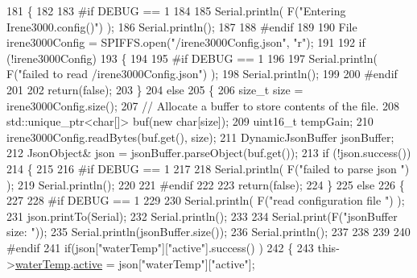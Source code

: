 \begin{DoxyCode}
181 \{
182 
183 \textcolor{preprocessor}{#if DEBUG == 1 }
184 
185     Serial.println( F(\textcolor{stringliteral}{"Entering Irene3000.config()"}) );
186     Serial.println();
187 
188 \textcolor{preprocessor}{#endif}
189 
190     File irene3000Config = SPIFFS.open(\textcolor{stringliteral}{"/irene3000Config.json"}, \textcolor{stringliteral}{"r"});
191 
192     \textcolor{keywordflow}{if} (!irene3000Config) 
193     \{
194     
195 \textcolor{preprocessor}{    #if DEBUG == 1 }
196 
197         Serial.println( F(\textcolor{stringliteral}{"failed to read /irene3000Config.json"}) );
198         Serial.println();
199     
200 \textcolor{preprocessor}{    #endif}
201 
202         \textcolor{keywordflow}{return}(\textcolor{keyword}{false});
203     \}
204     \textcolor{keywordflow}{else}
205     \{
206         \textcolor{keywordtype}{size\_t} size = irene3000Config.size();
207         \textcolor{comment}{// Allocate a buffer to store contents of the file.}
208         std::unique\_ptr<char[]> buf(\textcolor{keyword}{new} \textcolor{keywordtype}{char}[size]);
209             uint16\_t tempGain;
210         irene3000Config.readBytes(buf.get(), size);
211         DynamicJsonBuffer jsonBuffer;
212         JsonObject& json = jsonBuffer.parseObject(buf.get());
213         \textcolor{keywordflow}{if} (!json.success()) 
214         \{
215         
216 \textcolor{preprocessor}{        #if DEBUG == 1 }
217 
218             Serial.println( F(\textcolor{stringliteral}{"failed to parse json "}) );
219             Serial.println();
220         
221 \textcolor{preprocessor}{        #endif}
222             
223             \textcolor{keywordflow}{return}(\textcolor{keyword}{false});
224         \} 
225         \textcolor{keywordflow}{else}
226         \{
227         
228 \textcolor{preprocessor}{        #if DEBUG == 1 }
229     
230             Serial.println( F(\textcolor{stringliteral}{"read configuration file "}) );
231             json.printTo(Serial);
232             Serial.println();
233 
234             Serial.print(F(\textcolor{stringliteral}{"jsonBuffer size: "}));
235             Serial.println(jsonBuffer.size());
236             Serial.println();
237 
238         
239 
240 \textcolor{preprocessor}{        #endif          }
241             \textcolor{keywordflow}{if}(json[\textcolor{stringliteral}{"waterTemp"}][\textcolor{stringliteral}{"active"}].success() )
242             \{           
243                 this->\hyperlink{class_irene3000_af05612c78c758ce9db316c75ad937130}{waterTemp}.\hyperlink{struct_irene3000_1_1state_a879828ace7e7a7bc91ff703bfee36599}{active} = json[\textcolor{stringliteral}{"waterTemp"}][\textcolor{stringliteral}{"active"}]; 

\end{DoxyCode}
